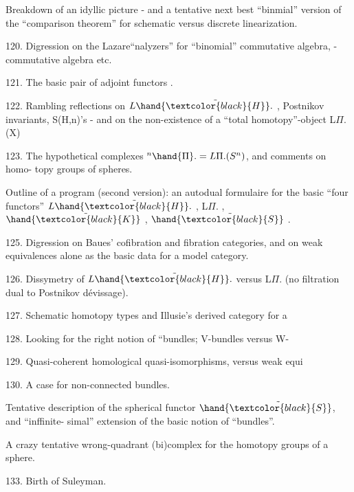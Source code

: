 \hand{\textcircled{\textcolor{black}{119.}}} Breakdown of an idyllic picture -  and a tentative next best
``binmial'' version of the ``comparison theorem'' for schematic versus
discrete linearization.

\margin{\{}120. Digression on the Lazare``nalyzers'' for ``binomial'' commutative
algebra, \hand{$\lambda$}- commutative algebra etc.

121. The basic pair of adjoint functors  .

122. Rambling reflections on $L\hand{\tilde{\textcolor{black}{H}}}.$ , Postnikov invariants, S(H,n)'s -
and on the non-existence of a ``total homotopy''-object L$\Pi$.(X) 
 

123. The hypothetical complexes $^{n}\hand{\Pi}. = L\Pi.(S^{n})$, and comments on homo-%
topy groups of spheres.

\hand{\textcircled{\textcolor{black}{124.}}} Outline of a program (second version): an autodual formulaire for
the basic ``four functors'' $L\hand{\tilde{\textcolor{black}{H}}}.$ , L$\Pi$. , $\hand{\tilde{\textcolor{black}{K}}}$ , $\hand{\tilde{\textcolor{black}{S}}}$ .

125. Digression on Baues' cofibration and fibration categories, and
on weak equivalences alone as the basic data for a model category.

126. Dissymetry of $L\hand{\tilde{\textcolor{black}{H}}}.$ versus L$\Pi$. (no filtration dual to Postnikov
dévissage).

127. Schematic homotopy types and Illusie's derived category for a 

128. Looking for the right notion of ``bundles; V-bundles versus W-

129. Quasi-coherent homological quasi-isomorphisms, versus weak equi

130. A case for non-connected bundles.

\hand{\textcircled{\textcolor{black}{131.}}} Tentative description of the spherical functor $\hand{\tilde{\textcolor{black}{S}}}$, and ``inffinite-%
simal'' extension of the basic notion of ``bundles''.

\hand{\textcircled{\textcolor{black}{132.}}} A crazy\hand{,} tentative\hand{,} wrong-quadrant (bi)complex for the homotopy
groups of a sphere.
\margin{\hrulefill}

133. Birth of Suleyman.

